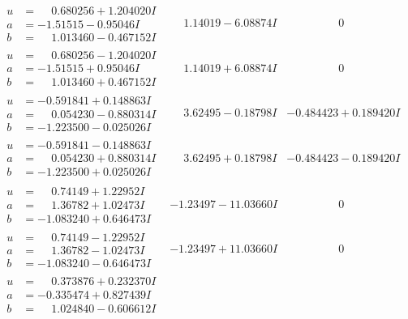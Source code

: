 \documentclass[1p]{elsarticle_modified}
\theoremstyle{definition}
\begin{document}
$$\begin{array}{c|c|c}
\begin{aligned}
u &= \phantom{-}0.680256 + 1.204020 I \\
a &= -1.51515 - 0.95046 I \\
b &= \phantom{-}1.013460 - 0.467152 I\end{aligned}
 & \phantom{-}1.14019 - 6.08874 I & \phantom{-0.000000 } 0 \\ \hline\begin{aligned}
u &= \phantom{-}0.680256 - 1.204020 I \\
a &= -1.51515 + 0.95046 I \\
b &= \phantom{-}1.013460 + 0.467152 I\end{aligned}
 & \phantom{-}1.14019 + 6.08874 I & \phantom{-0.000000 } 0 \\ \hline\begin{aligned}
u &= -0.591841 + 0.148863 I \\
a &= \phantom{-}0.054230 - 0.880314 I \\
b &= -1.223500 - 0.025026 I\end{aligned}
 & \phantom{-}3.62495 - 0.18798 I & -0.484423 + 0.189420 I \\ \hline\begin{aligned}
u &= -0.591841 - 0.148863 I \\
a &= \phantom{-}0.054230 + 0.880314 I \\
b &= -1.223500 + 0.025026 I\end{aligned}
 & \phantom{-}3.62495 + 0.18798 I & -0.484423 - 0.189420 I \\ \hline\begin{aligned}
u &= \phantom{-}0.74149 + 1.22952 I \\
a &= \phantom{-}1.36782 + 1.02473 I \\
b &= -1.083240 + 0.646473 I\end{aligned}
 & -1.23497 - 11.03660 I & \phantom{-0.000000 } 0 \\ \hline\begin{aligned}
u &= \phantom{-}0.74149 - 1.22952 I \\
a &= \phantom{-}1.36782 - 1.02473 I \\
b &= -1.083240 - 0.646473 I\end{aligned}
 & -1.23497 + 11.03660 I & \phantom{-0.000000 } 0 \\ \hline\begin{aligned}
u &= \phantom{-}0.373876 + 0.232370 I \\
a &= -0.335474 + 0.827439 I \\
b &= \phantom{-}1.024840 - 0.606612 I\end{aligned}

\end{array}$$
\end{document}

